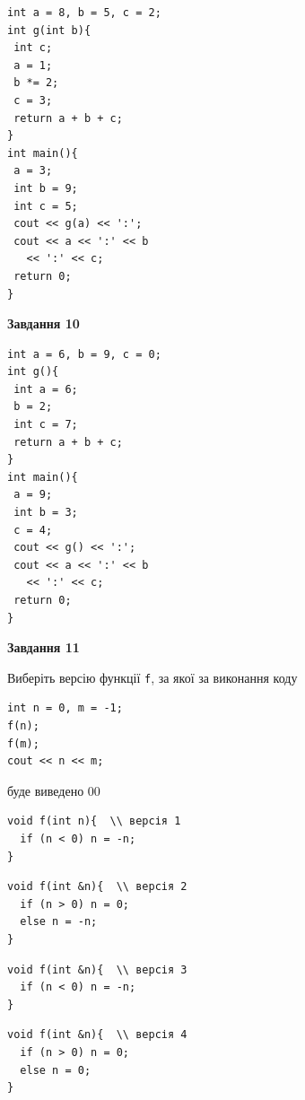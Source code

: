 \documentclass[12pt, ukrainian]{article}
\def\code#1{\Verb!#1!}
\begin{document}
{\begin {large}
\begin{minipage}[t]{7.0cm}
\begin{verbatim}
int a = 8, b = 5, c = 2;
int g(int b){
 int c;
 a = 1;
 b *= 2;
 c = 3;
 return a + b + c;
}
int main(){
 a = 3;
 int b = 9;
 int c = 5;
 cout << g(a) << ':';
 cout << a << ':' << b 
   << ':' << c;
 return 0;
}
\end{verbatim}



\begin{center}
\textbf{Завдання 10}
\end{center}
\vspace{-8mm}

\begin{verbatim}
int a = 6, b = 9, c = 0;
int g(){
 int a = 6;
 b = 2;
 int c = 7;
 return a + b + c;
}
int main(){
 a = 9;
 int b = 3;
 c = 4;
 cout << g() << ':';
 cout << a << ':' << b 
   << ':' << c;
 return 0;
}
\end{verbatim}

\end{minipage}
\vline \hspace{1mm}
\begin{minipage}[t]{11.0cm}

\begin{center}
\textbf{Завдання 11}
\end{center}
Виберіть версію функції \code{f}, за якої за виконання коду
\begin{verbatim}
int n = 0, m = -1;
f(n);
f(m);
cout << n << m;
\end{verbatim}

буде виведено 00

\begin{verbatim}
void f(int n){  \\ версія 1
  if (n < 0) n = -n;
}
\end{verbatim}

\vspace{-8mm}\begin{verbatim}
void f(int &n){  \\ версія 2
  if (n > 0) n = 0;
  else n = -n;
}
\end{verbatim}

\vspace{-8mm}\begin{verbatim}
void f(int &n){  \\ версія 3
  if (n < 0) n = -n;
}
\end{verbatim}

\vspace{-8mm}\begin{verbatim}
void f(int &n){  \\ версія 4
  if (n > 0) n = 0;
  else n = 0;
}
\end{verbatim}




\end{minipage}
\end{large}}
\end{document}
